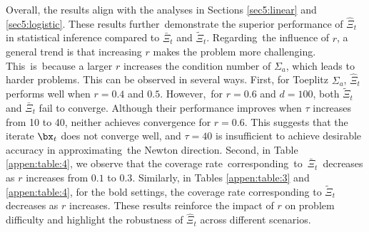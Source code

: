 Overall, the results align with the analyses in Sections \ref{sec5:linear} and \ref{sec5:logistic}. These results further~demonstrate the superior performance of $\hat{\Xi}_t$ in statistical inference compared to $\bar{\Xi}_t$ and $\tilde{\Xi}_t$. Regarding~the influence of $r$, a general trend is that increasing $r$ makes the problem more challenging. This~is~because a larger $r$ increases the condition number of $\Sigma_a$, which leads to harder problems. This can be observed in several ways. 
First, for Toeplitz $\Sigma_a$, $\hat{\Xi}_t$ performs well when $r = 0.4$ and $0.5$. However,~for $r = 0.6$ and $d = 100$, both $\tilde{\Xi}_t$ and $\bar{\Xi}_t$ fail to converge. Although their performance improves when $\tau$ increases from 10 to 40, neither achieves convergence for $r = 0.6$. This suggests that the iterate $\bx_t$ does not converge well, and $\tau = 40$ is insufficient to achieve desirable accuracy in approximating~the Newton direction. 
Second, in Table \ref{appen:table:4}, we observe that the coverage rate~corresponding~to~$\bar{\Xi}_t$~decreases as $r$ increases from $0.1$ to $0.3$. Similarly, in Tables \ref{appen:table:3} and \ref{appen:table:4}, for the bold settings, the coverage rate corresponding to $\tilde{\Xi}_t$ decreases as $r$ increases. These results reinforce the impact of $r$ on problem difficulty and highlight the robustness of $\hat{\Xi}_t$ across different scenarios.




